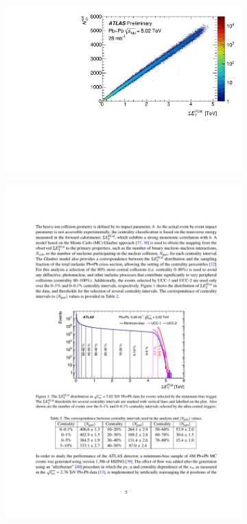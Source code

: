 \begin{figure}
\centering
\begin{subfigure}{.45\textwidth}
  \centering
  \includegraphics[width=\linewidth]{figures/setup/nch_fcal}
          \caption{}
          \label{fig:nch_fcal}
\end{subfigure}
\qquad  \qquad  
\begin{subfigure}{.45\textwidth}  
  \centering
  \includegraphics[width=\linewidth]{figures/setup/fcal_distr}

\end{subfigure}
\end{figure}
